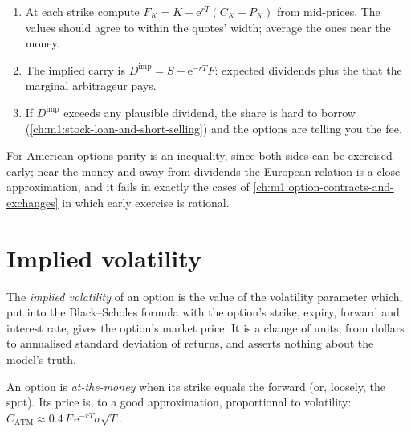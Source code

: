 \begin{method}\label{met:m1:volatility-first-contact:forward}
\begin{enumerate}
\item At each strike compute $F_K = K + \mathrm{e}^{rT}(C_K - P_K)$ from
mid-prices. The values should agree to within the quotes' width; average the
ones near the money.
\item The implied carry is $D^{\text{imp}} = S - \mathrm{e}^{-rT}F$: expected
dividends plus the  that the marginal arbitrageur pays.
\item If $D^{\text{imp}}$ exceeds any plausible dividend, the share is hard
to borrow (\cref{ch:m1:stock-loan-and-short-selling}) and the options are
telling you the fee.
\end{enumerate}
\end{method}

For American options parity is an inequality, since both sides can be
exercised early; near the money and away from dividends the European relation
is a close approximation, and it fails in exactly the cases of
\cref{ch:m1:option-contracts-and-exchanges} in which early exercise is
rational.

\section{Implied volatility}

\begin{definition}\label{def:m1:volatility-first-contact:iv}
The \emph{implied volatility} of an option is the
value of the volatility parameter which, put into the Black--Scholes
formula with the option's strike, expiry, forward and interest rate, gives
the option's market price. It is a change of units, from dollars to annualised
standard deviation of returns, and asserts nothing about the model's truth.
\end{definition}

\begin{definition}\label{def:m1:volatility-first-contact:atm}
An option is \emph{at-the-money} when its strike equals
the forward (or, loosely, the spot). Its price is, to a good approximation,
proportional to volatility:
$C_{\text{ATM}} \approx 0.4\,F\,\mathrm{e}^{-rT}\sigma\sqrt{T}$.
\end{definition}


